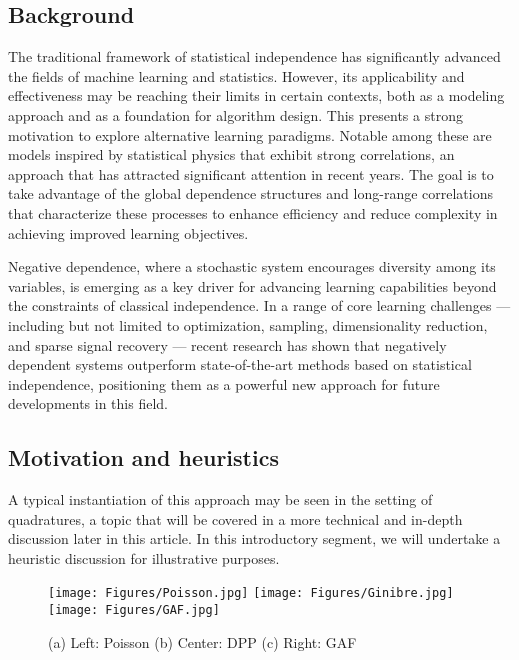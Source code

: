 \subsection{Background}
The traditional framework of statistical independence has significantly advanced the fields of machine learning and statistics. However, its applicability and effectiveness may be reaching their limits in certain contexts, both as a modeling approach and as a foundation for algorithm design. This presents a strong motivation to explore alternative learning paradigms. Notable among these are models inspired by statistical physics that exhibit strong correlations, an approach that has attracted significant attention in recent years. The goal is to take advantage of the global dependence structures and long-range correlations that characterize these processes to enhance efficiency and reduce complexity in achieving improved learning objectives.

Negative dependence, where a stochastic system encourages diversity among its variables, is emerging as a key driver for advancing learning capabilities beyond the constraints of classical independence. In a range of core learning challenges — including but not limited to optimization, sampling, dimensionality reduction, and sparse signal recovery — recent research has shown that negatively dependent systems outperform state-of-the-art methods based on statistical independence, positioning them as a powerful new approach for future developments in this field.

\subsection{Motivation and heuristics}
A typical instantiation of this approach may be seen in the setting of quadratures, a topic that will be covered in a more technical and in-depth discussion later in this article. In this introductory segment, we will undertake a heuristic discussion for illustrative purposes. 

\begin{figure}[h]
    \centering
    \texttt{[image: Figures/Poisson.jpg]}
    \texttt{[image: Figures/Ginibre.jpg]}
     \texttt{[image: Figures/GAF.jpg]}
     \caption{(a) Left: Poisson  \qquad (b) Center: DPP \qquad (c) Right: GAF}
    \label{fig:poisson-dpp-gaf}
\end{figure}


